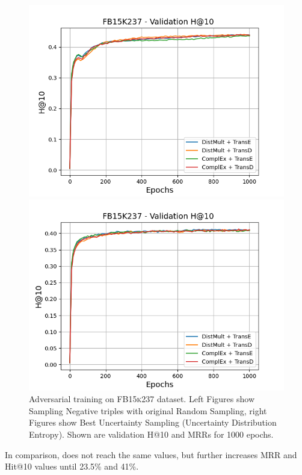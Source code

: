 \begin{figure}
\begin{minipage}{.5\textwidth}
    \end{minipage}
    \begin{minipage}{.5\textwidth}
      \centering
      \includegraphics[width=0.9\linewidth]{figures/results/gan_train/not_pretrained/random/fb15k237/epochs1000/random_fb15k237_hit10.png}
    \end{minipage}%
    \begin{minipage}{.5\textwidth}
      \centering
      \includegraphics[width=0.9\linewidth]{figures/results/gan_train/not_pretrained/uncertainty/max_distribution/entropy/fb15k237/1k_epochs/uncertainty_fb15k237_hit10.png}
    \end{minipage}%
    \caption{Adversarial training on \textsc{FB15k237} dataset. 
    Left Figures show Sampling Negative triples with original Random Sampling, right Figures show Best Uncertainty Sampling (Uncertainty Distribution Entropy).
    Shown are validation H@10 and MRRs for 1000 epochs.}
    \label{fig:advtrain_fb15k237_random_vs_uncertainty}
\end{figure}
In comparison, \ussoftmax does not reach the same values, but further increases MRR and Hit@10 values until 23.5\% and 41\%.

